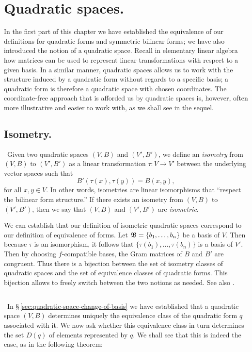 \section{Quadratic spaces.}

In the first part of this chapter we have established the equivalence of our definitions for quadratic forms and symmetric bilinear forms; we have also introduced the notion of a quadratic space. Recall in elementary linear algebra how matrices can be used to represent linear transformations with respect to a given basis. In a similar manner, quadratic spaces allows us to work with the structure induced by a quadratic form without regards to a specific basis; a quadratic form is therefore a quadratic space with chosen coordinates. The coordinate-free approach that is afforded us by quadratic spaces is, however, often more illustrative and easier to work with, as we shall see in the sequel.

\subsection{Isometry.}~Given two quadratic spaces \((V, B)\) and \((V', B')\), we define an \emph{isometry} from \((V, B)\) to \((V', B')\) as a linear transformation \(\tau : V \to V'\) between the underlying vector spaces such that
\[
  B'(\tau(x), \tau(y)) = B(x, y),
\]
for all \(x, y \in V\). In other words, isometries are linear isomorphisms that ``respect the bilinear form structure.'' \cite{clarkquadratic} If there exists an isometry from \((V, B)\) to \((V', B')\), then we say that \((V, B)\) and \((V', B')\) are \emph{isometric}.\label{sec:isometry}

We can establish that our definition of isometric quadratic spaces correspond to our definition of equivalence of forms. Let \(\mathfrak{B} = \{b_1, \dots, b_n\}\) be a basis of \(V\). Then because \(\tau\) is an isomorphism, it follows that \(\{\tau(b_1), \dots, \tau(b_n)\}\) is a basis of \(V'\). Then by choosing \(f\)-compatible bases, the Gram matrices of \(B\) and \(B'\) are congruent. Thus there is a bijection between the set of isometry classes of quadratic spaces and the set of equivalence classes of quadratic forms. This bijection allows to freely switch between the two notions as needed. See also \cite[p.~39--40]{szymiczek2017bilinear}.

\subsection{}~In \S\,\ref{sec:quadratic-space-change-of-basis} we have established that a quadratic space \((V, B)\) determines uniquely the equivalence class of the quadratic form \(q\) associated with it. We now ask whether this equivalence class in turn determines the set \(D(q)\) of elements represented by \(q\). We shall see that this is indeed the case, as in the following theorem:\label{sec:equivalence-implies-same-representation}

